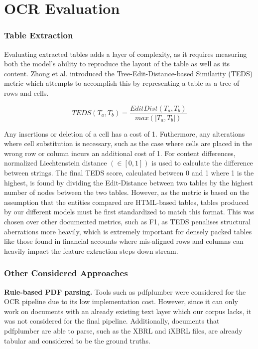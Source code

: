 \documentclass[ %
                    author={Natchalin Iwsakul \\ Inkaphol Siriwongwattana \\ Tanaphan Kummaraphat \\ Patorn Srisupap},
                supervisor={Fernando Moreno-Pino},
                    degree={MSc},
                     title={Propensity Modelling for SME Commercial Lending Using Open Public Data},
                  subtitle={Companies House filings and GDELT media coverage as predictors of first-time borrowing},
                      type={},
                      year={2026}]{dissertation}
\begin{document}


\section{OCR Evaluation}

\subsubsection{Table Extraction}
\label{sec:evaluation_table_extraction}
Evaluating extracted tables adds a layer of complexity, as it requires measuring both the model's ability to reproduce the layout of the table as well as its content. Zhong et al. \cite{zhong_2020} introduced the Tree-Edit-Distance-based Similarity (TEDS) metric which attempts to accomplish this by representing a table as a tree of rows and cells.

$$ TEDS(T_a,T_b)= \frac{EditDist(T_a,T_b)}{max(|T_a,T_b|)}$$

Any insertions or deletion of a cell has a cost of 1. Futhermore, any alterations where cell substitution is necessary, such as the case where cells are placed in the wrong row or column incurs an additional cost of 1. For content differences, normalized Liechtenstein distance $(\in[0,1])$ \cite{levenshtein_1966} is used to calculate the difference between strings. The final TEDS score, calculated between 0 and 1 where 1 is the highest, is found by dividing the Edit-Distance between two tables by the highest number of nodes between the two tables. However, as the metric is based on the assumption that the entities compared are HTML-based tables, tables produced by our different models must be first standardized to match this format. This was chosen over other documented metrics, such as F1, as TEDS penalises structural aberrations more heavily, which is extremely important for densely packed tables like those found in financial accounts where mis-aligned rows and columns can heavily impact the feature extraction steps down stream.

\subsubsection{Other Considered Approaches}

\textbf{Rule-based PDF parsing.}
Tools such as pdfplumber were considered for the OCR pipeline due to its low implementation cost. However, since it can only work on documents with an already existing text layer which our corpus lacks, it was not considered for the final pipeline. Additionally, documents that pdfplumber are able to parse, such as the XBRL and iXBRL files, are already tabular and considered to be the ground truths.
\end{document}
